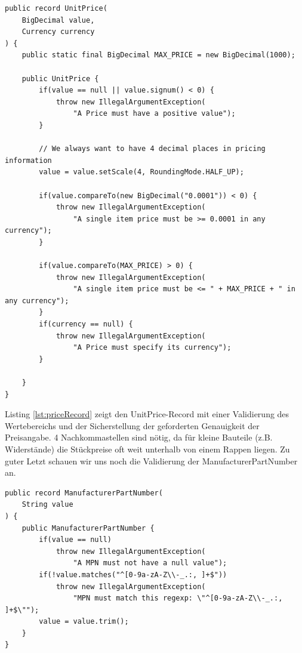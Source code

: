 \begin{listing}[H]
\begin{verbatim}
public record UnitPrice(
    BigDecimal value,
    Currency currency
) {
    public static final BigDecimal MAX_PRICE = new BigDecimal(1000);

    public UnitPrice {
        if(value == null || value.signum() < 0) {
            throw new IllegalArgumentException(
                "A Price must have a positive value");
        }
       
        // We always want to have 4 decimal places in pricing information
        value = value.setScale(4, RoundingMode.HALF_UP);
        
        if(value.compareTo(new BigDecimal("0.0001")) < 0) {
            throw new IllegalArgumentException(
                "A single item price must be >= 0.0001 in any currency");
        }

        if(value.compareTo(MAX_PRICE) > 0) {
            throw new IllegalArgumentException(
                "A single item price must be <= " + MAX_PRICE + " in any currency");
        }
        if(currency == null) {
            throw new IllegalArgumentException(
                "A Price must specify its currency");
        }

    }
}
\end{verbatim}
\caption{UnitPrice-Record mit Validation}
\label{lst:priceRecord}
\end{listing}

Listing \ref{lst:priceRecord} zeigt den UnitPrice-Record mit einer Validierung
des Wertebereichs und der Sicherstellung der geforderten Genauigkeit der 
Preisangabe. 4 Nachkommastellen sind nötig, da für kleine Bauteile 
(z.B. Widerstände) die Stückpreise oft weit unterhalb von einem Rappen liegen.
Zu guter Letzt schauen wir uns noch die Validierung der ManufacturerPartNumber an.

\begin{listing}[H]
\begin{verbatim}
public record ManufacturerPartNumber(
    String value
) {
    public ManufacturerPartNumber {
        if(value == null) 
            throw new IllegalArgumentException(
                "A MPN must not have a null value");
        if(!value.matches("^[0-9a-zA-Z\\-_.:, ]+$"))
            throw new IllegalArgumentException(
                "MPN must match this regexp: \"^[0-9a-zA-Z\\-_.:, ]+$\"");
        value = value.trim();
    }
}
\end{verbatim}
\caption{ManufacturerPartNumber mit Validation}
\label{lst:mpnRecord}
\end{listing}

